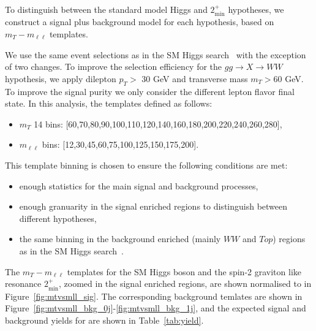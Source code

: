 To distinguish between the standard model Higgs and $2_\text{min}^+$ hypotheses, 
we construct a signal plus background model for each hypothesis, based on 
 $m_T-m_{\ell\ell}$ templates.%

We use the same event selections as in the SM Higgs search~\cite{HWWHCP2012} with the exception of two changes.
To improve the selection efficiency for the $gg\to X\to WW$ hypothesis,
we apply dilepton $p_T>$ 30 GeV and transverse mass $m_T>$60 GeV.
To improve the signal purity we only consider the different lepton flavor final state.
In this analysis, the templates defined as follows:
\begin{itemize}
\item $m_T$ 14 bins: [60,70,80,90,100,110,120,140,160,180,200,220,240,260,280],
\item $m_{\ell\ell}$ bins: [12,30,45,60,75,100,125,150,175,200].
\end{itemize}

This template binning is chosen to ensure the following conditions are met:

\begin{itemize}
    \item enough statistics for the main signal and background processes, 
    \item enough granuarity in the signal enriched regions to distinguish between 
different hypotheses, 
    \item the same binning in the background enriched (mainly $WW$ and $Top$) regions 
as in the SM Higgs search~\cite{HWWHCP2012}. 
\end{itemize}
The $m_T-m_{\ell\ell}$ templates for the SM Higgs boson and 
the spin-2 graviton like resonance $2_\text{min}^+$, zoomed in the 
signal enriched regions, are shown normalised to \intlumiEightTeV 
in Figure~\ref{fig:mtvsmll_sig}.
The corresponding background temlates are shown in 
Figure~\ref{fig:mtvsmll_bkg_0j}-\ref{fig:mtvsmll_bkg_1j}, and the expected signal and
background yields for \intlumiEightTeV are shown in Table~\ref{tab:yield}.



